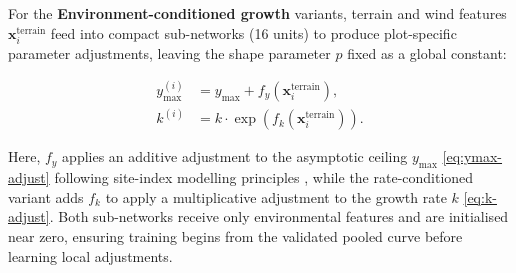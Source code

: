 For the \textbf{Environment-conditioned growth} variants, terrain and wind features $\mathbf{x}^{\text{terrain}}_i$ feed into compact sub-networks (16 units) to produce plot-specific parameter adjustments, leaving the shape parameter $p$ fixed as a global constant:

\begin{subequations}
\label{eq:env-adjustments}
\begin{align}
y_{\max}^{(i)} &= y_{\max} + f_{y}\!\left(\mathbf{x}^{\text{terrain}}_i\right), \label{eq:ymax-adjust} \\
k^{(i)} &= k \cdot \exp\!\left(f_{k}\!\left(\mathbf{x}^{\text{terrain}}_i\right)\right). \label{eq:k-adjust}
\end{align}
\end{subequations}

Here, $f_y$ applies an additive adjustment to the asymptotic ceiling $y_{\max}$ \eqref{eq:ymax-adjust} following site-index modelling principles \citep{socha2023Higher_C1_SS}, while the rate-conditioned variant adds $f_k$ to apply a multiplicative adjustment to the growth rate $k$ \eqref{eq:k-adjust}. Both sub-networks receive only environmental features and are initialised near zero, ensuring training begins from the validated pooled curve before learning local adjustments.

